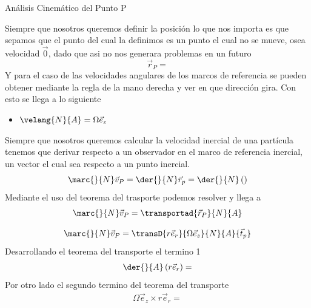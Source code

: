 \begin{sol}
\begin{cinematicaUnificada}{Análisis Cinemático del Punto P}
        
        Siempre que nosotros queremos definir la posición lo que nos importa es que sepamos que el punto del cual la definimos es un punto el cual no se mueve, osea velocidad $\vec{0}$, dado que asi no nos generara problemas en un futuro
        \begin{equation}
            \vec{r}_P=
        \end{equation}
        Y para el caso de las velocidades angulares de los marcos de referencia se pueden obtener mediante la regla de la mano derecha y ver en que dirección gira. Con esto se llega a lo siguiente
        \begin{itemize}
            \item $\velang{N}{A}=\Omega\vec{e}_z$
        \end{itemize}

        Siempre que nosotros queremos calcular la velocidad inercial de una partícula tenemos que derivar respecto a un observador en el marco de referencia inercial, un vector el cual sea respecto a un punto inercial.
        \begin{equation}
            \marc{}{N}\vec{v}_P=\der{}{N}\vec{r}_p=\der{}{N}\left(\right)
        \end{equation}
        Mediante el uso del teorema del trasporte podemos resolver y llega a 
        \begin{equation}
            \marc{}{N}\vec{v}_P=\transportad{\vec{r}_P}{N}{A}
        \end{equation}
        
        
        
        \begin{equation}
            \marc{}{N}\vec{v}_P=\transD{r\vec{e}_r}{\Omega\vec{e}_z}{N}{A}{\vec{t}_p}
        \end{equation}
        Desarrollando el teorema del transporte el termino 1
        \begin{align}
            \der{}{A}\left(r\vec{e}_r\right)=
        \end{align}
        Por otro lado el segundo termino del teorema del transporte
        \begin{align}
            \Omega\vec{e}_z\times r\vec{e}_r=
        \end{align}


\end{cinematicaUnificada}
\end{sol}
